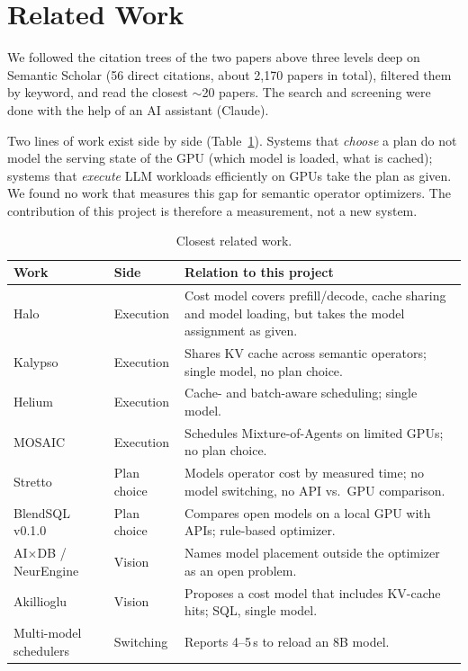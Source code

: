 \documentclass[11pt,a4paper]{article}
\begin{document}
\section{Related Work}\label{sec:related}

We followed the citation trees of the two papers above three levels deep on Semantic Scholar (56
direct citations, about 2,170 papers in total), filtered them by keyword, and read the closest
$\sim$20 papers. The search and screening were done with the help of an AI assistant (Claude).

Two lines of work exist side by side (Table~\ref{tab:related}). Systems that \emph{choose} a plan do
not model the serving state of the GPU (which model is loaded, what is cached); systems that
\emph{execute} LLM workloads efficiently on GPUs take the plan as given. We found no work that
measures this gap for semantic operator optimizers. The contribution of this project is therefore a
measurement, not a new system.

\begin{table}[h]
\centering\small
\begin{tabularx}{\linewidth}{@{}llX@{}}
\toprule
Work & Side & Relation to this project \\
\midrule
Halo \cite{halo} & Execution & Cost model covers prefill/decode, cache sharing and model loading, but takes the model assignment as given. \\
Kalypso \cite{kalypso} & Execution & Shares KV cache across semantic operators; single model, no plan choice. \\
Helium \cite{helium} & Execution & Cache- and batch-aware scheduling; single model. \\
MOSAIC \cite{mosaic} & Execution & Schedules Mixture-of-Agents on limited GPUs; no plan choice. \\
Stretto \cite{stretto} & Plan choice & Models operator cost by measured time; no model switching, no API vs.\ GPU comparison. \\
BlendSQL v0.1.0 \cite{blendsql} & Plan choice & Compares open models on a local GPU with APIs; rule-based optimizer. \\
AI$\times$DB / NeurEngine \cite{aixdb} & Vision & Names model placement outside the optimizer as an open problem. \\
Akillioglu \cite{akillioglu2025} & Vision & Proposes a cost model that includes KV-cache hits; SQL, single model. \\
Multi-model schedulers \cite{multimodelsched} & Switching & Reports 4--5\,s to reload an 8B model. \\
\bottomrule
\end{tabularx}
\caption{Closest related work.}\label{tab:related}
\end{table}
\end{document}
